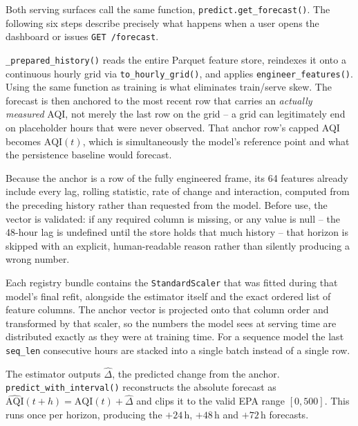 \documentclass[11pt,a4paper]{article}
\begin{document}
Both serving surfaces call the same function,
\texttt{predict.get\_forecast()}. The following six steps describe precisely
what happens when a user opens the dashboard or issues
\texttt{GET /forecast}.

\begin{description}[leftmargin=1.4em,style=nextline,itemsep=4pt]

\item[Step 1 -- Load and prepare history.]
\texttt{\_prepared\_history()} reads the entire Parquet feature store,
reindexes it onto a continuous hourly grid via \texttt{to\_hourly\_grid()}, and
applies \texttt{engineer\_features()}. Using the same function as training is
what eliminates train/serve skew. The forecast is then anchored to the most
recent row that carries an \emph{actually measured} AQI, not merely the last
row on the grid -- a grid can legitimately end on placeholder hours that were
never observed. That anchor row's capped AQI becomes
$\text{AQI}(t)$, which is simultaneously the model's reference point and what
the persistence baseline would forecast.

\item[Step 2 -- Compute lag and rolling features.]
Because the anchor is a row of the fully engineered frame, its 64 features
already include every lag, rolling statistic, rate of change and interaction,
computed from the preceding history rather than requested from the model.
Before use, the vector is validated: if any required column is missing, or any
value is null -- the 48-hour lag is undefined until the store holds that much
history -- that horizon is skipped with an explicit, human-readable reason
rather than silently producing a wrong number.

\item[Step 3 -- Scale with the deployed model's own transformer.]
Each registry bundle contains the \texttt{StandardScaler} that was fitted
during that model's final refit, alongside the estimator itself and the exact
ordered list of feature columns. The anchor vector is projected onto that
column order and transformed by that scaler, so the numbers the model sees at
serving time are distributed exactly as they were at training time. For a
sequence model the last \texttt{seq\_len} consecutive hours are stacked into a
single batch instead of a single row.

\item[Step 4 -- Predict the change and reconstruct the level.]
The estimator outputs $\widehat{\Delta}$, the predicted change from the anchor.
\texttt{predict\_with\_interval()} reconstructs the absolute forecast as
$\widehat{\text{AQI}}(t+h) = \text{AQI}(t) + \widehat{\Delta}$ and clips it to
the valid EPA range $[0, 500]$. This runs once per horizon, producing the
$+24$\,h, $+48$\,h and $+72$\,h forecasts.


\end{description}
\end{document}
